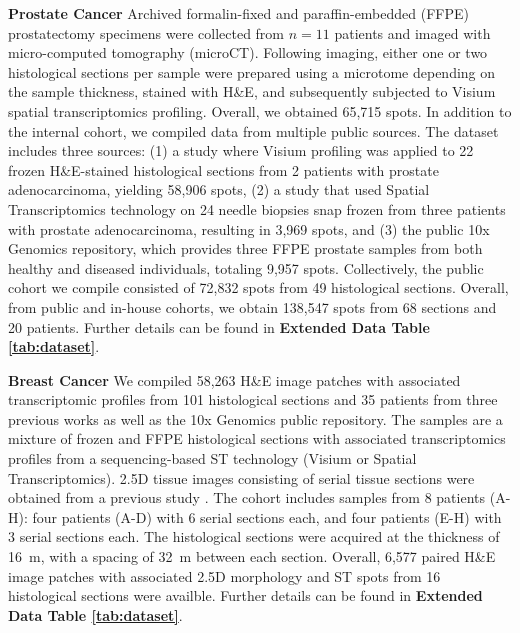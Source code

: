 

\noindent\textbf{Prostate Cancer} Archived formalin-fixed and paraffin-embedded (FFPE) prostatectomy specimens were collected from $n=11$ patients and imaged with micro-computed tomography (microCT). Following imaging, either one or two histological sections per sample were prepared using a microtome depending on the sample thickness, stained with H\&E, and subsequently subjected to Visium spatial transcriptomics profiling. Overall, we obtained 65,715 spots. 
In addition to the internal cohort, we compiled data from multiple public sources.  The dataset includes three sources: (1) a study where Visium profiling was applied to 22 frozen H\&E-stained histological sections from 2 patients with prostate adenocarcinoma, yielding 58,906 spots\cite{erickson2022spatially}, (2) a study that used Spatial Transcriptomics technology on 24 needle biopsies snap frozen from three patients with prostate adenocarcinoma, resulting in 3,969 spots\cite{marklund2022spatio}, and (3) the public 10x Genomics repository, which provides three FFPE prostate samples from both healthy and diseased individuals, totaling 9,957 spots. Collectively, the public cohort we compile consisted of 72,832 spots from 49 histological sections. Overall, from public and in-house cohorts, we obtain 138,547 spots from 68 sections and 20 patients. Further details can be found in \textbf{Extended Data Table \ref{tab:dataset}}.


\noindent\textbf{Breast Cancer} We compiled 58,263 H\&E image patches with associated transcriptomic profiles from 101 histological sections and 35 patients from three previous works\cite{andersson2021spatial, staahl2016visualization, he2020integrating} as well as the 10x Genomics public repository. The samples are a mixture of frozen and FFPE histological sections with associated transcriptomics profiles from a 
sequencing-based ST technology (Visium or Spatial Transcriptomics). 
2.5D tissue images consisting of serial tissue sections were obtained from a previous study \cite{andersson2021spatial}. The cohort includes samples from 8 patients (A-H): four patients (A-D) with 6 serial sections each, and four patients (E-H) with 3 serial sections each. The histological sections were acquired at the thickness of 16~\textmu m, with a spacing of 32~\textmu m between each section.  Overall, 6,577 paired H\&E image patches with associated 2.5D morphology and ST spots from 16 histological sections were availble. Further details can be found in \textbf{Extended Data Table \ref{tab:dataset}}.

